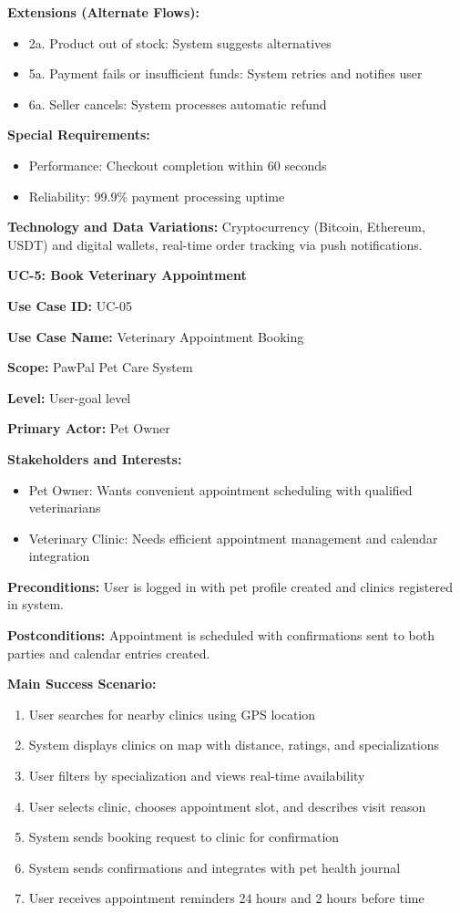 \textbf{Extensions (Alternate Flows):}
\begin{itemize}
    \item 2a. Product out of stock: System suggests alternatives
    \item 5a. Payment fails or insufficient funds: System retries and notifies user
    \item 6a. Seller cancels: System processes automatic refund
\end{itemize}

\textbf{Special Requirements:}
\begin{itemize}
    \item Performance: Checkout completion within 60 seconds
    \item Reliability: 99.9\% payment processing uptime
\end{itemize}

\textbf{Technology and Data Variations:} Cryptocurrency (Bitcoin, Ethereum, USDT) and digital wallets, real-time order tracking via push notifications.

\textbf{UC-5: Book Veterinary Appointment}

\textbf{Use Case ID:} UC-05

\textbf{Use Case Name:} Veterinary Appointment Booking

\textbf{Scope:} PawPal Pet Care System

\textbf{Level:} User-goal level

\textbf{Primary Actor:} Pet Owner

\textbf{Stakeholders and Interests:}
\begin{itemize}
    \item Pet Owner: Wants convenient appointment scheduling with qualified veterinarians
    \item Veterinary Clinic: Needs efficient appointment management and calendar integration
\end{itemize}

\textbf{Preconditions:} User is logged in with pet profile created and clinics registered in system.

\textbf{Postconditions:} Appointment is scheduled with confirmations sent to both parties and calendar entries created.

\textbf{Main Success Scenario:}
\begin{enumerate}
    \item User searches for nearby clinics using GPS location
    \item System displays clinics on map with distance, ratings, and specializations
    \item User filters by specialization and views real-time availability
    \item User selects clinic, chooses appointment slot, and describes visit reason
    \item System sends booking request to clinic for confirmation
    \item System sends confirmations and integrates with pet health journal
    \item User receives appointment reminders 24 hours and 2 hours before time
\end{enumerate}

